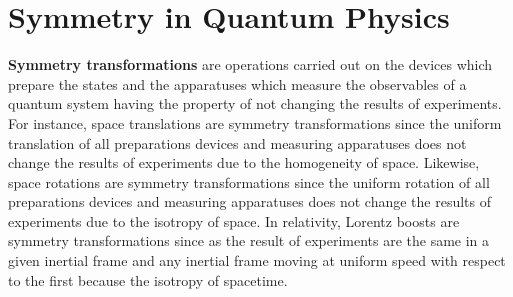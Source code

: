 \chapter{Symmetry in Quantum Physics}

\textbf{Symmetry transformations} are operations carried out on the devices which prepare the states and the apparatuses which measure the observables of a quantum system having the property of not changing the results of experiments. For instance, space translations are symmetry transformations since the uniform translation of all preparations devices and measuring apparatuses does not change the results of experiments due to the homogeneity of space. Likewise, space rotations are symmetry transformations since the uniform rotation of all preparations devices and measuring apparatuses does not change the results of experiments due to the isotropy of space. In relativity, Lorentz boosts are symmetry transformations since as the result of experiments are the same in a given inertial frame and any inertial frame moving at uniform speed with respect to the first because the isotropy of spacetime.

